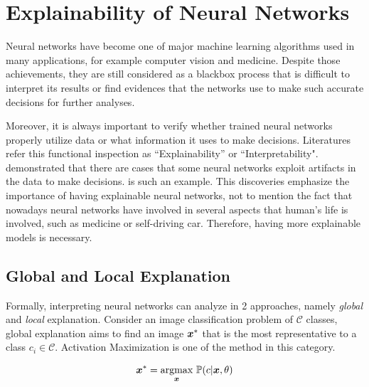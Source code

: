 \section{Explainability of Neural Networks}
Neural networks have become one of major machine learning algorithms used in many applications, for example computer vision and medicine. Despite those achievements, they are still considered as a blackbox process that is  difficult to interpret its results or find evidences that the networks use to make such accurate decisions for further analyses.


Moreover, it is always important to verify whether trained neural networks properly utilize data or what information it uses to make decisions. Literatures refer this functional inspection as ``Explainability'' or ``Interpretability". \cite{BachAnalyzingclassifiersFisher2016, RibeiroWhyShouldTrust2016} demonstrated that there are cases that some neural networks exploit artifacts in the data to make decisions. \addfigure{\ref{fig:husky_explanation}} is such an example. This discoveries emphasize the importance of having explainable neural networks, not to mention the fact that nowadays neural networks have involved in several aspects that human's life is involved, such as medicine or self-driving car. Therefore, having more explainable models is necessary.

\subsection{Global and Local Explanation}
Formally, interpreting neural networks can analyze in 2 approaches, namely \textit{global} and \textit{local} explanation. Consider an image  classification problem of $\mathcal{C}$ classes, global explanation aims to find an image $\patvector{x}^*$ that is the most representative to a class $c_i \in \mathcal{C}$. Activation Maximization\cite{ErhanUnderstandingRepresentationsLearned2010} is one of the method in this category.

\begin{align}
\patvector{x}^*  = \patarg{max}{\patvector{x}}  \mathbb{P}( c |\patvector{x},\theta)
\end{align}


